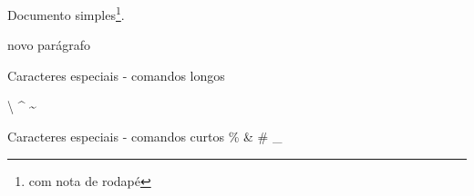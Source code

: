 \documentclass[a4paper, 12pt]{article}
\begin{document}
	Documento simples\footnote{com nota de rodapé}.
	
	novo parágrafo
	
	Caracteres especiais - comandos longos
	
	\textbraceleft
	\textbraceright
	\textdollar
	\textunderscore
	\textbackslash
	\textasciicircum
	\textasciitilde
	
	Caracteres especiais - comandos curtos
	\%
	\&
	\#
	\_	
	
\end{document}
